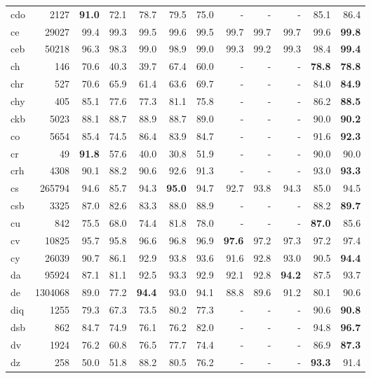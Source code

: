 \documentclass[11pt,a4paper]{article}
\begin{document}
\begin{supertabular}{lrrr|rrr|rrr|rr}
cdo & 2127 & \textbf{91.0} & 72.1 & 78.7 & 79.5 & 75.0 & - & - & - & 85.1 & 86.4\\
ce & 29027 & 99.4 & 99.3 & 99.5 & 99.6 & 99.5 & 99.7 & 99.7 & 99.7 & 99.6 & \textbf{99.8}\\
ceb & 50218 & 96.3 & 98.3 & 99.0 & 98.9 & 99.0 & 99.3 & 99.2 & 99.3 & 98.4 & \textbf{99.4}\\
ch & 146 & 70.6 & 40.3 & 39.7 & 67.4 & 60.0 & - & - & - & \textbf{78.8} & \textbf{78.8}\\
chr & 527 & 70.6 & 65.9 & 61.4 & 63.6 & 69.7 & - & - & - & 84.0 & \textbf{84.9}\\
chy & 405 & 85.1 & 77.6 & 77.3 & 81.1 & 75.8 & - & - & - & 86.2 & \textbf{88.5}\\
ckb & 5023 & 88.1 & 88.7 & 88.9 & 88.7 & 89.0 & - & - & - & 90.0 & \textbf{90.2}\\
co & 5654 & 85.4 & 74.5 & 86.4 & 83.9 & 84.7 & - & - & - & 91.6 & \textbf{92.3}\\
cr & 49 & \textbf{91.8} & 57.6 & 40.0 & 30.8 & 51.9 & - & - & - & 90.0 & 90.0\\
crh & 4308 & 90.1 & 88.2 & 90.6 & 92.6 & 91.3 & - & - & - & 93.0 & \textbf{93.3}\\
cs & 265794 & 94.6 & 85.7 & 94.3 & \textbf{95.0} & 94.7 & 92.7 & 93.8 & 94.3 & 85.0 & 94.5\\
csb & 3325 & 87.0 & 82.6 & 83.3 & 88.0 & 88.9 & - & - & - & 88.2 & \textbf{89.7}\\
cu & 842 & 75.5 & 68.0 & 74.4 & 81.8 & 78.0 & - & - & - & \textbf{87.0} & 85.6\\
cv & 10825 & 95.7 & 95.8 & 96.6 & 96.8 & 96.9 & \textbf{97.6} & 97.2 & 97.3 & 97.2 & 97.4\\
cy & 26039 & 90.7 & 86.1 & 92.9 & 93.8 & 93.6 & 91.6 & 92.8 & 93.0 & 90.5 & \textbf{94.4}\\
da & 95924 & 87.1 & 81.1 & 92.5 & 93.3 & 92.9 & 92.1 & 92.8 & \textbf{94.2} & 87.5 & 93.7\\
de & 1304068 & 89.0 & 77.2 & \textbf{94.4} & 93.0 & 94.1 & 88.8 & 89.6 & 91.2 & 80.1 & 90.6\\
diq & 1255 & 79.3 & 67.3 & 73.5 & 80.2 & 77.3 & - & - & - & 90.6 & \textbf{90.8}\\
dsb & 862 & 84.7 & 74.9 & 76.1 & 76.2 & 82.0 & - & - & - & 94.8 & \textbf{96.7}\\
dv & 1924 & 76.2 & 60.8 & 76.5 & 77.7 & 74.4 & - & - & - & 86.9 & \textbf{87.3}\\
dz & 258 & 50.0 & 51.8 & 88.2 & 80.5 & 76.2 & - & - & - & \textbf{93.3} & 91.4\\

\end{supertabular}
\end{document}

